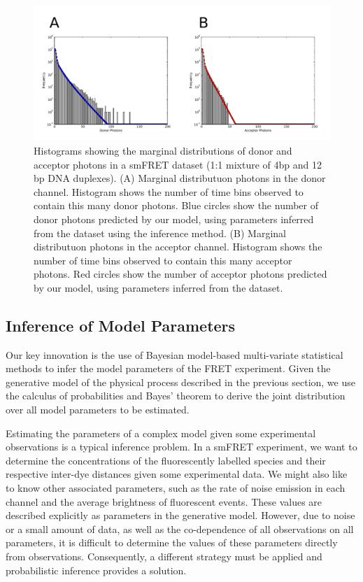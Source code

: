\begin{figure}
   \begin{center}
      \includegraphics*[width=6in]{inference/marginal_distributions.pdf}
      \caption{Histograms showing the marginal distributions of donor and acceptor photons in a smFRET dataset (1:1 mixture of 4bp and 12 bp DNA duplexes). (A) Marginal distributuon photons in the donor channel. Histogram shows the number of time bins observed to contain this many donor photons. Blue circles show the number of donor photons predicted by our model, using parameters inferred from the dataset using the inference method. (B) Marginal distributuon photons in the acceptor channel. Histogram shows the number of time bins observed to contain this many acceptor photons. Red circles show the number of acceptor photons predicted by our model, using parameters inferred from the dataset.}
      \label{fig:marginals}
   \end{center}
\end{figure}

\clearpage

\subsection{Inference of Model Parameters}
Our key innovation is the use of Bayesian model-based multi-variate statistical methods to infer the model parameters of the FRET experiment. Given the generative model of the physical process described in the previous section, we use the calculus of probabilities and Bayes' theorem to derive the joint distribution over all model parameters to be estimated.

Estimating the parameters of a complex model given some experimental observations is a typical inference problem. In a smFRET experiment, we want to determine the concentrations of the fluorescently labelled species and their respective inter-dye distances given some experimental data. We might also like to know other associated parameters, such as the rate of noise emission in each channel and the average brightness of fluorescent events. These values are described explicitly as parameters in the generative model. However, due to noise or a small amount of data, as well as the co-dependence of all observations on all parameters, it is difficult to determine the values of these parameters directly from observations. Consequently, a different strategy must be applied and probabilistic inference provides a solution.


